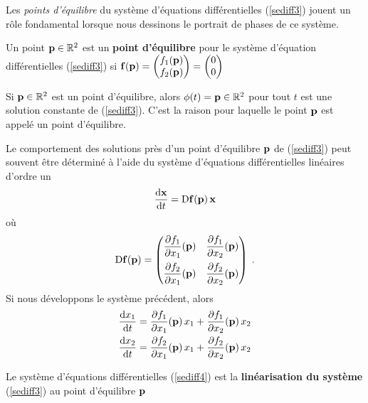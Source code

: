 {Les {\em points d'équilibre} du système d'équations différentielles
(\ref{sediff3}) jouent un rôle fondamental lorsque nous dessinons le
portrait de phases de ce système.

\begin{focus}{\dfn}
Un point $\mathbf{p} \in \mathbb{R}^2$ est un {\bfseries point
d'équilibre} pour le système d'équation différentielles (\ref{sediff3}) si
$\displaystyle \mathbf{f}(\mathbf{p}) =
\begin{pmatrix}
f_1(\mathbf{p}) \\ f_2(\mathbf{p})
\end{pmatrix} =
\begin{pmatrix}
0 \\ 0
\end{pmatrix}
$
\end{focus}

Si $\mathbf{p}\in \mathbb{R}^2$ est un point d'équilibre, alors
$\phi(t) = \mathbf{p} \in \mathbb{R}^2$ pour tout $t$ est une solution constante
de (\ref{sediff3}).  C'est la raison pour laquelle le point $\mathbf{p}$
est appelé un point d'équilibre.

Le comportement des solutions près d'un point d'équilibre $\mathbf{p}$ de
(\ref{sediff3}) peut souvent être déterminé à l'aide du
système d'équations différentielles linéaires d'ordre un
\begin{equation}\label{sediff4}
\frac{\mathrm{d}\mathbf{x}}{\mathrm{d}t} = \mathrm{D} \mathbf{f}(\mathbf{p}) \, \mathbf{x}
\end{equation}
où
\[
\mathrm{D} \mathbf{f}(\mathbf{p}) =
\begin{pmatrix}
\displaystyle \frac{\partial f_1}{\partial x_1}(\mathbf{p}) &
\displaystyle \frac{\partial f_1}{\partial x_2}(\mathbf{p}) \\[1em]
\displaystyle \frac{\partial f_2}{\partial x_1}(\mathbf{p}) &
\displaystyle \frac{\partial f_2}{\partial x_2}(\mathbf{p})
\end{pmatrix} \; .
\]
Si nous développons le système précédent, alors
\begin{align*}
\frac{\mathrm{d}x_1}{\mathrm{d}t} &= \frac{\partial f_1}{\partial x_1}(\mathbf{p})\,x_1 +
\frac{\partial f_1}{\partial x_2}(\mathbf{p})\,x_2 \\
\frac{\mathrm{d}x_2}{\mathrm{d}t} &= \frac{\partial f_2}{\partial x_1}(\mathbf{p})\,x_1 +
\frac{\partial f_2}{\partial x_2}(\mathbf{p})\,x_2 \\
\end{align*}

\begin{focus}{\dfn}
Le système d'équations différentielles (\ref{sediff4}) est la
{\bfseries linéarisation du système} (\ref{sediff3}) au point d'équilibre
$\mathbf{p}$
\end{focus}

}
